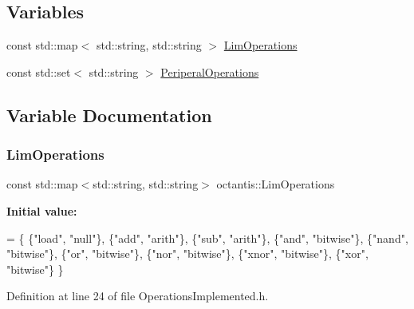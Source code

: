 \subsection*{Variables}
\begin{DoxyCompactItemize}
\item 
const std\+::map$<$ std\+::string, std\+::string $>$ \hyperlink{namespaceoctantis_a49f0001417908900d6959ac7a8037ebd}{Lim\+Operations}
\item 
const std\+::set$<$ std\+::string $>$ \hyperlink{namespaceoctantis_adec74f4b9921d5c7eecef4f9174c3510}{Periperal\+Operations}
\end{DoxyCompactItemize}


\subsection{Variable Documentation}
\mbox{\label{namespaceoctantis_a49f0001417908900d6959ac7a8037ebd}} 
\subsubsection{\texorpdfstring{Lim\+Operations}{LimOperations}}
{\footnotesize\ttfamily const std\+::map$<$std\+::string, std\+::string$>$ octantis\+::\+Lim\+Operations}

{\bfseries Initial value\+:}
\begin{DoxyCode}
= \{
    \{\textcolor{stringliteral}{"load"}, \textcolor{stringliteral}{"null"}\},
    \{\textcolor{stringliteral}{"add"}, \textcolor{stringliteral}{"arith"}\},
    \{\textcolor{stringliteral}{"sub"}, \textcolor{stringliteral}{"arith"}\},
    \{\textcolor{stringliteral}{"and"}, \textcolor{stringliteral}{"bitwise"}\},
    \{\textcolor{stringliteral}{"nand"}, \textcolor{stringliteral}{"bitwise"}\},
    \{\textcolor{stringliteral}{"or"}, \textcolor{stringliteral}{"bitwise"}\},
    \{\textcolor{stringliteral}{"nor"}, \textcolor{stringliteral}{"bitwise"}\},
    \{\textcolor{stringliteral}{"xnor"}, \textcolor{stringliteral}{"bitwise"}\},
    \{\textcolor{stringliteral}{"xor"}, \textcolor{stringliteral}{"bitwise"}\}
\}
\end{DoxyCode}


Definition at line 24 of file Operations\+Implemented.\+h.

\mbox{\label{namespaceoctantis_adec74f4b9921d5c7eecef4f9174c3510}} 
